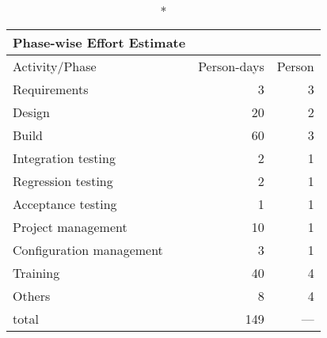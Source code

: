 \documentclass[a4paper,11pt]{article}
\begin{document}
\begin{center}
\begin{longtable}{|l|r|r|}
\caption*{Phase-wise Effort Estimate} \\
\hline Activity/Phase            & Person-days & Person \\
\hline Requirements              & 3           & 3 \\
\hline Design                    & 20          & 2 \\
\hline Build                     & 60          & 3 \\
\hline Integration testing       & 2           & 1 \\
\hline Regression testing        & 2           & 1 \\
\hline Acceptance testing        & 1           & 1 \\
\hline Project management        & 10          & 1 \\
\hline Configuration  management & 3           & 1 \\
\hline Training                  & 40          & 4 \\
\hline Others                    & 8           & 4 \\
\hline total                     & 149         & --- \\
\hline 
\end{longtable}
\end{center}
\end{document}
